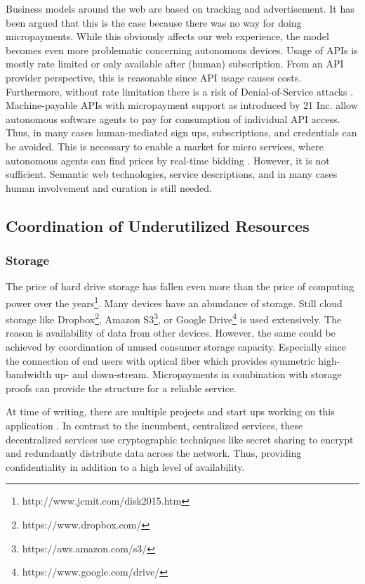 Business models around the web are based on tracking and advertisement. It has been argued that this is the case because there was no way for doing micropayments. While this obviously affects our web experience, the model becomes even more problematic concerning autonomous devices. Usage of APIs is mostly rate limited or only available after (human) subscription. From an API provider perspective, this is reasonable since API usage causes costs. Furthermore, without rate limitation there is a risk of Denial-of-Service attacks \parencite{Needham:1993:DS:168588.168607}. Machine-payable APIs with micropayment support as introduced by 21 Inc. allow autonomous software agents to pay for consumption of individual API access. Thus, in many cases human-mediated sign ups, subscriptions, and credentials can be avoided. This is necessary to enable a market for micro services, where autonomous agents can find prices by real-time bidding . However, it is not sufficient. Semantic web technologies, service descriptions, and in many cases human involvement and curation is still needed. 

\subsection{Coordination of Underutilized Resources}


\subsubsection{Storage}

The price of hard drive storage has fallen even more than the price of computing power over the years\footnote{http://www.jcmit.com/disk2015.htm}. Many devices have an abundance of storage. Still cloud storage like Dropbox\footnote{https://www.dropbox.com/}, Amazon S3\footnote{https://aws.amazon.com/s3/}, or Google Drive\footnote{https://www.google.com/drive/} is used extensively. The reason is availability of data from other devices. However, the same could be achieved by coordination of unused consumer storage capacity. Especially since the connection of end users with optical fiber which provides symmetric high-bandwidth up- and down-stream. Micropayments in combination with storage proofs \parencite{Vorick2014sia} can provide the structure for a reliable service. 

At time of writing, there are multiple projects and start ups working on this application \parencite{Vorick2014sia,filecoin2014,maidsafe2014,storj2014}. 
In contrast to the incumbent, centralized services, these decentralized services use cryptographic techniques like secret sharing \parencite{Shamir:1979:SS:359168.359176} to encrypt and redundantly distribute data across the network. Thus, providing confidentiality in addition to a high level of availability. 

